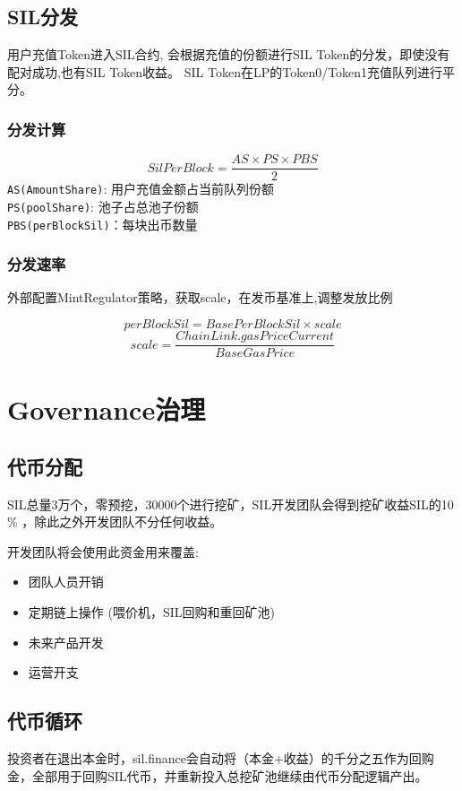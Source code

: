 \documentclass[11pt,letterpaper]{article}
\begin{document}
\begin{multicols}{2}
\subsection{SIL分发}
用户充值Token进入SIL合约, 会根据充值的份额进行SIL Token的分发，即使没有配对成功,也有SIL Token收益。 SIL Token在LP的Token0/Token1充值队列进行平分。

\subsubsection{分发计算}
\[ SilPerBlock = \frac{AS \times PS \times PBS}{2} \]
\texttt{AS(AmountShare)}: 用户充值金额占当前队列份额\\
\texttt{PS(poolShare)}: 池子占总池子份额\\
\texttt{PBS(perBlockSil)}：每块出币数量

\subsubsection{分发速率}
外部配置MintRegulator策略，获取scale，在发币基准上,调整发放比例

\[ perBlockSil =  BasePerBlockSil \times scale \]
\[ scale = \frac{ChainLink.gasPriceCurrent}{BaseGasPrice} \]

\section{Governance治理}
\subsection{代币分配}
SIL总量3万个，零预挖，30000个进行挖矿，SIL开发团队会得到挖矿收益SIL的10 \% ，除此之外开发团队不分任何收益。

开发团队将会使用此资金用来覆盖:
\begin{itemize}
    \item 团队人员开销
    \item 定期链上操作 (喂价机，SIL回购和重回矿池)
    \item 未来产品开发
    \item 运营开支
\end{itemize}

\subsection{代币循环}
投资者在退出本金时，sil.finance会自动将（本金+收益）的千分之五作为回购金，全部用于回购SIL代币，并重新投入总挖矿池继续由代币分配逻辑产出。


\end{multicols}
\end{document}
